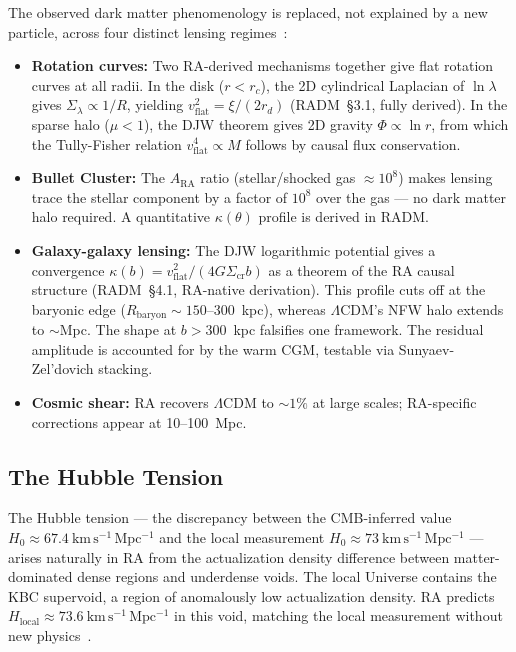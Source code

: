 \documentclass[11pt,a4paper]{article}
\begin{document}
The observed dark matter phenomenology is replaced, not explained by a
new particle, across four distinct lensing regimes~\citep{Sandeman2026RADM}:
\begin{itemize}[noitemsep]
  \item \textbf{Rotation curves:} Two RA-derived mechanisms together
  give flat rotation curves at all radii. In the disk ($r < r_c$),
  the 2D cylindrical Laplacian of $\ln\lambda$ gives $\Sigma_\lambda \propto 1/R$,
  yielding $v_\mathrm{flat}^2 = \xi/(2r_d)$ (RADM~\S3.1, fully derived).
  In the sparse halo ($\mu < 1$), the DJW theorem gives 2D gravity
  $\Phi \propto \ln r$, from which the Tully-Fisher relation
  $v_\mathrm{flat}^4 \propto M$ follows by causal flux conservation.
  \item \textbf{Bullet Cluster:} The $A_{\mathrm{RA}}$ ratio
  (stellar/shocked gas $\approx 10^8$) makes lensing trace the stellar
  component by a factor of $10^8$ over the gas --- no dark matter halo
  required. A quantitative $\kappa(\theta)$ profile is derived in RADM.
  \item \textbf{Galaxy-galaxy lensing:} The DJW logarithmic potential
  gives a convergence $\kappa(b) = v_\mathrm{flat}^2/(4G\Sigma_\mathrm{cr}b)$
  as a theorem of the RA causal structure (RADM~\S4.1, RA-native derivation).
  This profile cuts off at the baryonic edge ($R_\mathrm{baryon}\sim 150$--300~kpc),
  whereas $\Lambda$CDM's NFW halo extends to $\sim$Mpc.
  The shape at $b > 300$~kpc falsifies one framework. The residual amplitude
  is accounted for by the warm CGM, testable via Sunyaev-Zel'dovich stacking.
  \item \textbf{Cosmic shear:} RA recovers $\Lambda$CDM to $\sim1\%$
  at large scales; RA-specific corrections appear at 10--100~Mpc.
\end{itemize}

\subsection{The Hubble Tension}

The Hubble tension --- the discrepancy between the CMB-inferred value
$H_0 \approx 67.4~\mathrm{km\,s^{-1}\,Mpc^{-1}}$ and the local
measurement $H_0 \approx 73~\mathrm{km\,s^{-1}\,Mpc^{-1}}$ --- arises
naturally in RA from the actualization density difference between
matter-dominated dense regions and underdense voids. The local Universe
contains the KBC supervoid, a region of anomalously low actualization
density. RA predicts $H_{\mathrm{local}} \approx 73.6~\mathrm{km\,s^{-1}
\,Mpc^{-1}}$ in this void, matching the local measurement without
new physics~\citep{Sandeman2026RAGC, Sandeman2026RADM}.
\end{document}
